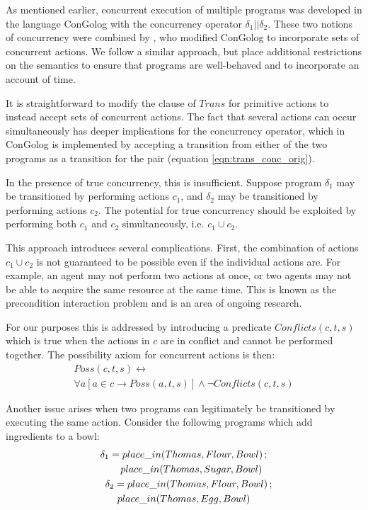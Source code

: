 \documentclass[letterpaper]{article}
\begin{document}
As mentioned earlier, concurrent execution of multiple programs
was developed in the language ConGolog with the concurrency operator
$\delta_1||\delta_2$.
These two notions of concurrency were combined by
\cite{pinto99tcongolog}, who modified ConGolog to incorporate sets
of concurrent actions. We follow a similar approach, but place
additional restrictions on the semantics to ensure that programs are
well-behaved and to incorporate an account of time.

It is straightforward to modify the clause of $Trans$
for primitive actions to instead accept sets of concurrent actions.
The fact that several actions can occur simultaneously has
deeper implications for the concurrency operator, which in ConGolog
is implemented by accepting a transition from either of the two programs
as a transition for the pair (equation \ref{eqn:trans_conc_orig}).

In the presence of true concurrency, this is insufficient. Suppose program
$\delta_1$ may be transitioned by performing actions $c_1$, and
$\delta_2$ may be transitioned by performing actions $c_2$.
The potential for true concurrency should be exploited by performing both $c_1$
and $c_2$ simultaneously, i.e. $c_1 \cup c_2$.

This approach introduces several complications. First, the combination
of actions $c_{1}\cup c_{2}$ is not guaranteed to be possible even if the
individual actions are.  For example, an agent may not perform two actions
at once, or two agents may not be able to acquire the same resource at the
same time.
This is known as the precondition interaction problem \cite{pinto94temporal}
and is an area of ongoing research.

For our purposes this is addressed by introducing a predicate $Conflicts(c,t,s)$
which is true when the actions in $c$ are in conflict and cannot
be performed together. The possibility axiom for concurrent actions
is then:
\begin{multline}
\label{eqn:poss_conc_acts}
Poss(c,t,s)\leftrightarrow\\
\forall a\left[a\in c\rightarrow Poss(a,t,s)\right]\wedge\neg Conflicts(c,t,s)
\end{multline}

Another issue arises when two programs can legitimately be transitioned
by executing the same action. Consider the following programs which
add ingredients to a bowl:
\begin{multline}
\delta_{1}=place\_ in(Thomas,Flour,Bowl)\,;\\
   \shoveright{place\_ in(Thomas,Sugar,Bowl)}\\
\shoveleft{\delta_{2}=place\_ in(Thomas,Flour,Bowl)\,;}\\
   place\_ in(Thomas,Egg,Bowl)
\end{multline}
\end{document}
